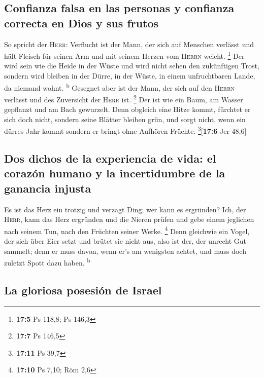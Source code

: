 \hypertarget{confianza-falsa-en-las-personas-y-confianza-correcta-en-dios-y-sus-frutos}{%
\subsection{Confianza falsa en las personas y confianza correcta en Dios
y sus
frutos}\label{confianza-falsa-en-las-personas-y-confianza-correcta-en-dios-y-sus-frutos}}

 So spricht der \textsc{Herr}: Verflucht ist der Mann, der
sich auf Menschen verlässt und hält Fleisch für seinen Arm und mit
seinem Herzen vom \textsc{Herrn} weicht. \footnote{\textbf{17:5} Ps
  118,8; Ps 146,3}  Der wird sein wie die Heide in der
Wüste und wird nicht sehen den zukünftigen Trost, sondern wird bleiben
in der Dürre, in der Wüste, in einem unfruchtbaren Lande, da niemand
wohnt. \textsuperscript{b}  Gesegnet aber ist der Mann,
der sich auf den \textsc{Herrn} verlässt und des Zuversicht der
\textsc{Herr} ist. \footnote{\textbf{17:7} Ps 146,5}  Der
ist wie ein Baum, am Wasser gepflanzt und am Bach gewurzelt. Denn
obgleich eine Hitze kommt, fürchtet er sich doch nicht, sondern seine
Blätter bleiben grün, und sorgt nicht, wenn ein dürres Jahr kommt
sondern er bringt ohne Aufhören Früchte. \footnote{\textbf{17:11} Ps
  39,7}{[}\textbf{17:6} Jer 48,6{]}

\hypertarget{dos-dichos-de-la-experiencia-de-vida-el-corazuxf3n-humano-y-la-incertidumbre-de-la-ganancia-injusta}{%
\subsection{Dos dichos de la experiencia de vida: el corazón humano y la
incertidumbre de la ganancia
injusta}\label{dos-dichos-de-la-experiencia-de-vida-el-corazuxf3n-humano-y-la-incertidumbre-de-la-ganancia-injusta}}

 Es ist das Herz ein trotzig und verzagt Ding; wer kann es
ergründen?  Ich, der \textsc{Herr}, kann das Herz
ergründen und die Nieren prüfen und gebe einem jeglichen nach seinem
Tun, nach den Früchten seiner Werke. \footnote{\textbf{17:10} Ps 7,10;
  Röm 2,6}  Denn gleichwie ein Vogel, der sich über Eier
setzt und brütet sie nicht aus, also ist der, der unrecht Gut sammelt;
denn er muss davon, wenn er's am wenigsten achtet, und muss doch zuletzt
Spott dazu haben. \textsuperscript{b}

\hypertarget{la-gloriosa-posesiuxf3n-de-israel}{%
\subsection{La gloriosa posesión de
Israel}\label{la-gloriosa-posesiuxf3n-de-israel}}

